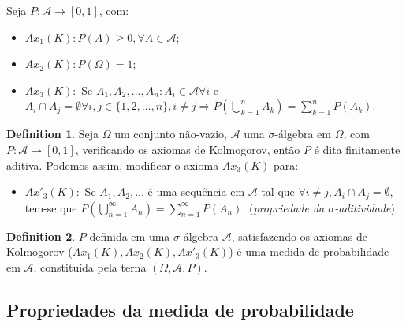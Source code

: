 \documentclass[
]{article}
\providecommand{\tightlist}{%
  \setlength{\itemsep}{0pt}\setlength{\parskip}{0pt}}
\theoremstyle{definition}
\newtheorem{definition}{Definition}[section]
\theoremstyle{definition}
\theoremstyle{definition}
\theoremstyle{definition}
\theoremstyle{remark}
\begin{document}
Seja \(P:\mathcal{A} \rightarrow [0,1]\), com:

\begin{itemize}
\tightlist
\item
  \(Ax_{1}(K): P(A) \ge 0, \forall A \in \mathcal{A}\);
\item
  \(Ax_{2}(K): P(\Omega) = 1\);
\item
  \(Ax_{3}(K):\) Se \(A_{1},A_{2},\dots,A_{n} : A_{i} \in \mathcal{A} \forall i\) e \(A_{i} \cap A_{j} = \emptyset \forall i,j \in \{1,2,\dots,n\}, i \neq j \Rightarrow P\left(\bigcup_{k=1}^{n}A_{k}\right) = \sum_{k=1}^{n}P(A_{k})\).
\end{itemize}

\begin{definition}

Seja \(\Omega\) um conjunto não-vazio, \(\mathcal{A}\) uma \(\sigma\)-álgebra em \(\Omega\), com \(P : \mathcal{A} \to [0,1]\), verificando os axiomas de Kolmogorov, então \(P\) é dita finitamente aditiva. Podemos assim, modificar o axioma \(Ax_{3}(K)\) para:

\begin{itemize}
\tightlist
\item
  \(Ax'_{3}(K):\) Se \(A_{1},A_{2},\dots\) é uma sequência em \(\mathcal{A}\) tal que \(\forall i \neq j, A_{i} \cap A_{j} = \emptyset\), tem-se que \(P\left(\bigcup_{n=1}^{\infty}A_{n}\right) = \sum_{n=1}^{\infty}P(A_{n})\). (\emph{propriedade da \(\sigma\)-aditividade})
\end{itemize}

\end{definition}

\begin{definition}
\(P\) definida em uma \(\sigma\)-álgebra \(\mathcal{A}\), satisfazendo os axiomas de Kolmogorov (\(Ax_{1}(K), Ax_{2}(K), Ax'_{3}(K)\)) é uma medida de probabilidade em \(\mathcal{A}\), constituída pela terna \((\Omega, \mathcal{A},P)\).
\end{definition}

\hypertarget{propriedades-da-medida-de-probabilidade}{%
\subsection{Propriedades da medida de probabilidade}\label{propriedades-da-medida-de-probabilidade}}
\end{document}
